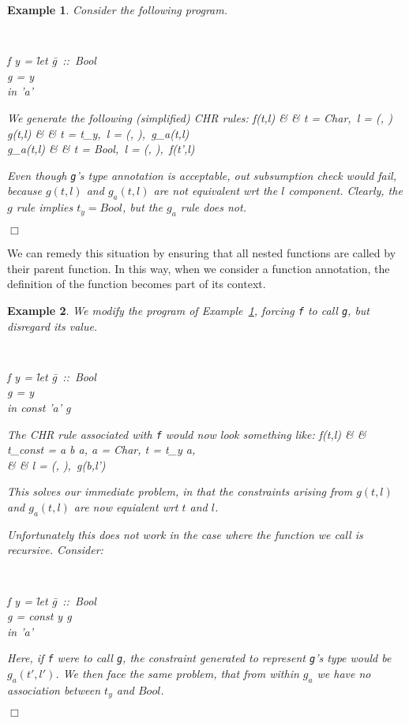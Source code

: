 \documentclass{article}
\newcommand{\arrow}[0]{\rightarrow}
\newcommand{\simparrow}[0]{\Longleftrightarrow}
\newtheorem{ex}{Example}
\newenvironment{example}{
        \begin{ex}\rm}%
        {\hfill$\Box$\end{ex}}
\newenvironment{ttprog}{\begin{trivlist} %
            \item \tt
        \begin{tabbing}}{\end{tabbing}\end{trivlist}}
\begin{document}
\begin{example}
\label{ex:ann-ctxt}
Consider the following program.

\begin{ttprog}
f y = \=let \=g~::~Bool \\
      \>    \>g = y     \\
      \>in  \>'a'
\end{ttprog}

We generate the following (simplified) CHR rules:
f(t,l) & \simparrow & t = Char,~l = (\llist{}, ) \\
g(t,l) & \simparrow & t = t_y,~l = (, ),~g_a(t,l) \\
g_a(t,l) & \simparrow & t = Bool,~l = (, ),~f(t',l) 
\eda

Even though {\tt g}'s type annotation is acceptable, out subsumption check
would fail, because $g(t,l)$ and $g_a(t,l)$ are not equivalent wrt the $l$
component. 
Clearly, the $g$ rule implies $t_y = Bool$, but the $g_a$ rule does not.

\end{example}

We can remedy this situation by ensuring that all nested functions are called 
by their parent function. In this way, when we consider a function annotation,
the definition of the function becomes part of its context.

\begin{example}
We modify the program of Example~\ref{ex:ann-ctxt}, forcing {\tt f} to call
{\tt g}, but disregard its value.

\begin{ttprog}
f y = \=let \=g~::~Bool \\
      \>    \>g = y     \\
      \>in  \>const 'a' g
\end{ttprog}

The CHR rule associated with {\tt f} would now look something like:
f(t,l) & \simparrow & t_{const} = a \arrow b \arrow a, a = Char, t = t_y \arrow a, \\
       &            & l = (\llist{}, ),~g(b,l')
\eda

This solves our immediate problem, in that the constraints arising from
$g(t,l)$ and $g_a(t,l)$ are now equialent wrt $t$ and $l$.

Unfortunately this does not work in the case where the function we call is
recursive. Consider:

\begin{ttprog}
f y = \=let \=g~::~Bool \\
      \>    \>g = const y g \\
      \>in  \>'a' 
\end{ttprog}

Here, if {\tt f} were to call {\tt g}, the constraint generated to represent
{\tt g}'s type would be $g_a(t',l')$.
We then face the same problem, that from within $g_a$ we have no association
between $t_y$ and $Bool$.

\end{example}
\end{document}
